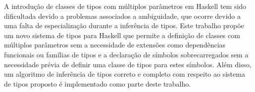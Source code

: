 A introdu\c{c}\~ao de classes de tipos com m\'ultiplos par\^ametros em Haskell tem sido
dificultada devido a problemas associados a ambiguidade, que ocorre devido a uma falta de
especializa\c{c}\~ao durante a infer\^encia de tipos. Este trabalho prop\~oe um novo sistema 
de tipos para Haskell que permite a defini\c{c}\~ao de classes com m\'ultiplos par\^ametros sem 
a necessidade de extens\~oes como depend\^encias funcionais ou fam\'ilias de tipos e a declara\c{c}\~ao de s\'imbolos
sobrecarregados sem a necessidade pr\'evia de definir uma classe de tipos para estes s\'imbolos. 
Al\'em disso, um algoritmo de infer\^encia de tipos correto e completo com respeito ao sistema de tipos proposto \'e
implementado como parte deste trabalho.

